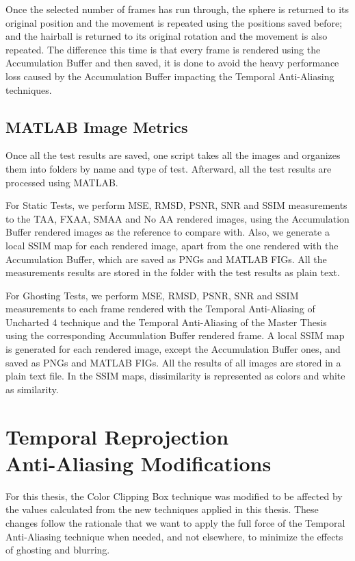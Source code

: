 \documentclass{cslthse-msc}
\begin{document}
Once the selected number of frames has run through, the sphere is returned to its original position and the movement is repeated using the positions saved before; and the hairball is returned to its original rotation and the movement is also repeated. The difference this time is that every frame is rendered using the Accumulation Buffer and then saved, it is done to avoid the heavy performance loss caused by the Accumulation Buffer impacting the Temporal Anti-Aliasing techniques.

\subsection{MATLAB Image Metrics}
Once all the test results are saved, one script takes all the images and organizes them into folders by name and type of test. Afterward, all the test results are processed using MATLAB.

For Static Tests, we perform MSE, RMSD, PSNR, SNR and SSIM measurements to the TAA, FXAA, SMAA and No AA rendered images, using the Accumulation Buffer rendered images as the reference to compare with. Also, we generate a local SSIM map for each rendered image, apart from the one rendered with the Accumulation Buffer, which are saved as PNGs and MATLAB FIGs. All the measurements results are stored in the folder with the test results as plain text. 

For Ghosting Tests, we perform MSE, RMSD, PSNR, SNR and SSIM measurements to each frame rendered with the Temporal Anti-Aliasing of Uncharted 4 technique and the Temporal Anti-Aliasing of the Master Thesis using the corresponding Accumulation Buffer rendered frame. A local SSIM map is generated for each rendered image, except the Accumulation Buffer ones, and saved as PNGs and MATLAB FIGs. All the results of all images are stored in a plain text file. In the SSIM maps, dissimilarity is represented as colors and white as similarity.


\section[Temporal Reprojection Anti-Aliasing Modifications]{Temporal Reprojection \\ Anti-Aliasing Modifications}
For this thesis, the Color Clipping Box technique was modified to be affected by the values calculated from the new techniques applied in this thesis. These changes follow the rationale that we want to apply the full force of the Temporal Anti-Aliasing technique when needed, and not elsewhere, to minimize the effects of ghosting and blurring.
\end{document}
